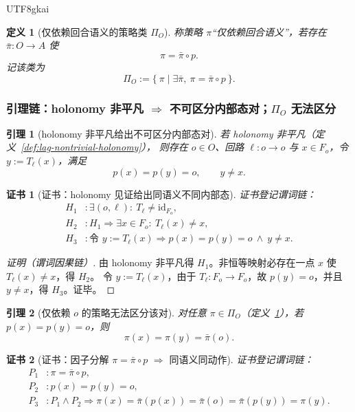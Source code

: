 \documentclass[12pt]{article}
\newtheorem{definition}{定义}[section]
\newtheorem{lemma}{引理}[section]
\newtheorem{Certificate}{证书}[section]
\begin{document}
\begin{CJK*}{UTF8}{gkai}
\begin{definition}[仅依赖回合语义的策略类 $\Pi_{O}$]
\label{def:lag-policy-only-o}
称策略 $\pi$“仅依赖回合语义”，若存在 $\bar\pi:O\to A$ 使
\[
  \pi=\bar\pi\circ p.
\]
记该类为
\[
  \Pi_{O}:=\{\ \pi\mid \exists\bar\pi,\ \pi=\bar\pi\circ p\ \}.
\]
\end{definition}

\subsubsection{引理链：holonomy 非平凡 $\Rightarrow$ 不可区分内部态对；$\Pi_O$ 无法区分}
\label{sec:lag-holonomy-lemmas}

\begin{lemma}[holonomy 非平凡给出不可区分内部态对]
\label{lem:lag-holonomy-gives-pair}
若 holonomy 非平凡（定义~\ref{def:lag-nontrivial-holonomy}），
则存在 $o\in O$、回路 $\ell:o\to o$ 与 $x\in F_o$，令 $y:=T_{\ell}(x)$，满足
\[
  p(x)=p(y)=o,\qquad y\neq x.
\]
\end{lemma}

\begin{Certificate}[证书：holonomy 见证给出同语义不同内部态]
\label{cert:lag-holonomy-gives-pair}
证书登记谓词链：
\[
\begin{aligned}
  H_1 &: \exists(o,\ell):\ T_{\ell}\neq \mathrm{id}_{F_o},\\
  H_2 &: H_1\Rightarrow \exists x\in F_o:\ T_{\ell}(x)\neq x,\\
  H_3 &: \text{令 }y:=T_{\ell}(x)\Rightarrow p(x)=p(y)=o\ \wedge\ y\neq x.
\end{aligned}
\]
\end{Certificate}

\begin{proof}[证明（谓词因果链）]
由 holonomy 非平凡得 $H_1$。非恒等映射必存在一点 $x$ 使 $T_{\ell}(x)\neq x$，得 $H_2$。
令 $y:=T_{\ell}(x)$，由于 $T_{\ell}:F_o\to F_o$，故 $p(y)=o$，并且 $y\neq x$，得 $H_3$。证毕。
\end{proof}

\begin{lemma}[仅依赖 $o$ 的策略无法区分该对]
\label{lem:lag-pio-cannot-distinguish}
对任意 $\pi\in\Pi_{O}$（定义~\ref{def:lag-policy-only-o}），若 $p(x)=p(y)=o$，则
\[
  \pi(x)=\pi(y)=\bar\pi(o).
\]
\end{lemma}

\begin{Certificate}[证书：因子分解 $\pi=\bar\pi\circ p$ $\Rightarrow$ 同语义同动作]
\label{cert:lag-pio-cannot-distinguish}
证书登记谓词链：
\[
\begin{aligned}
  P_1 &: \pi=\bar\pi\circ p,\\
  P_2 &: p(x)=p(y)=o,\\
  P_3 &: P_1\wedge P_2\Rightarrow \pi(x)=\bar\pi(p(x))=\bar\pi(o)=\bar\pi(p(y))=\pi(y).
\end{aligned}
\]
\end{Certificate}


\end{CJK*}
\end{document}
